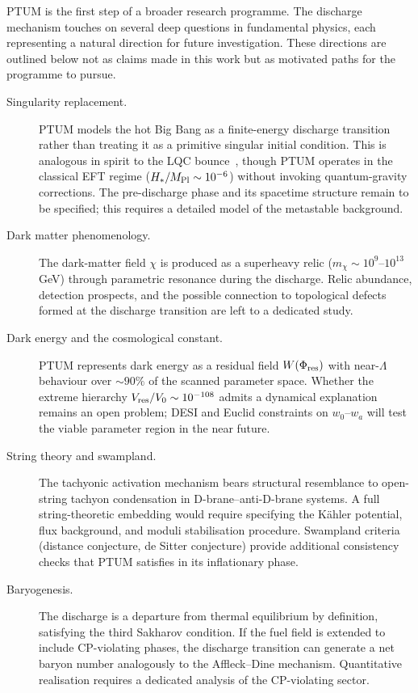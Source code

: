 \documentclass[epj]{svjour}
\begin{document}
PTUM is the first step of a broader research programme. The discharge
mechanism touches on several deep questions in fundamental physics,
each representing a natural direction for future investigation.
These directions are outlined below not as claims made in this work
but as motivated paths for the programme to pursue.

\begin{description}

\item[Singularity replacement.] 
PTUM models the hot Big Bang as a finite-energy discharge transition
rather than treating it as a primitive singular initial condition. This is analogous in spirit to
the LQC bounce~\cite{Bojowald2001,Ashtekar2011}, though PTUM operates in the classical EFT regime
($H_*/M_{\rm Pl}\sim10^{-6}$) without invoking quantum-gravity
corrections. The pre-discharge phase and its spacetime structure
remain to be specified; this requires a detailed model of the
metastable background.

\item[Dark matter phenomenology.] 
The dark-matter field $\chi$ is produced as a superheavy relic
($m_\chi\sim10^{9}$--$10^{13}\,$GeV) through parametric resonance
during the discharge. Relic abundance, detection prospects, and the
possible connection to topological defects formed at the discharge
transition are left to a dedicated study.

\item[Dark energy and the cosmological constant.] 
PTUM represents dark energy as a residual field $W(\Phi_{\rm res})$
with near-$\Lambda$ behaviour over $\sim90\%$ of the scanned
parameter space. Whether the extreme hierarchy
$V_{\rm res}/V_0\sim10^{-108}$ admits a dynamical explanation
remains an open problem; DESI and Euclid constraints on $w_0$--$w_a$
will test the viable parameter region in the near future.

\item[String theory and swampland.] 
The tachyonic activation mechanism bears structural resemblance to
open-string tachyon condensation in D-brane--anti-D-brane systems.
A full string-theoretic embedding would require specifying the
K\"ahler potential, flux background, and moduli stabilisation
procedure. Swampland criteria (distance conjecture, de Sitter
conjecture) provide additional consistency checks that PTUM
satisfies in its inflationary phase.

\item[Baryogenesis.] 
The discharge is a departure from thermal equilibrium by definition,
satisfying the third Sakharov condition. If the fuel field is extended
to include CP-violating phases, the discharge transition can generate
a net baryon number analogously to the Affleck--Dine mechanism.
Quantitative realisation requires a dedicated analysis of the
CP-violating sector.


\end{description}
\end{document}
